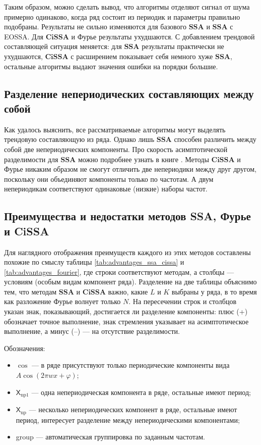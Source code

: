 \documentclass[a4paper, 11pt]{article}
\newcommand{\SSA}{\textbf{SSA}}
\newcommand{\CISSA}{\textbf{CiSSA}}
\newcommand{\TS}{\mathsf{X}}
\begin{document}
Таким образом, можно сделать вывод, что алгоритмы отделяют сигнал от шума примерно одинаково, когда ряд состоит из периодик и параметры правильно подобраны. Результаты не сильно изменяются для базового $\SSA$ и $\SSA$ с EOSSA. Для $\CISSA$ и Фурье результаты ухудшаются. С добавлением трендовой составляющей ситуация меняется: для $\SSA$ результаты практически не ухудшаются, $\CISSA$ с расширением показывает себя немного хуже $\SSA$, остальные алгоритмы выдают значения ошибки на порядки большие.

\subsection{Разделение непериодических составляющих между собой}
\label{subsubsec:nonperiodic}

Как удалось выяснить, все рассматриваемые алгоритмы могут выделять трендовую составляющую из ряда. Однако лишь $\SSA$ способен различить между собой две непериодических компоненты. Про скорость асимптотической разделимости для $\SSA$ можно подробнее узнать в книге \cite{golyandina2001analysis}. Методы $\CISSA$ и Фурье никаким образом не смогут отличить две непериодики между друг другом, поскольку они объединяют компоненты только по частотам. А двум непериодикам соответствуют одинаковые (низкие) наборы частот.


\subsection{Преимущества и недостатки методов SSA, Фурье и CiSSA}

Для наглядного отображения преимуществ каждого из этих методов составлены похожие по смыслу таблицы \ref{tab:advantages_ssa_cissa} и \ref{tab:advantages_fourier}, где строки соответствуют методам, а столбцы --- условиям (особым видам компонент ряда). Разделение на две таблицы объяснимо тем, что методам $\SSA$ и $\CISSA$ важно, какие $L$ и  $K$ выбраны у ряда, в то время как разложение Фурье волнует только $N$. На пересечении строк и столбцов указан знак, показывающий, достигается ли разделение компоненты: плюс (+) обозначает точное выполнение, знак стремления указывает на асимптотическое выполнение, а минус (–) --- на отсутствие разделимости.

Обозначения: 
\begin{itemize}
	\item $\cos$ --- в ряде присутствуют только периодические компоненты вида $A\cos(2\pi w x + \varphi)$;
	\item $\TS_{\mathrm{np}1}$ --- одна непериодическая компонента в ряде, остальные имеют период;
	\item $\TS_{\mathrm{np}}$ --- несколько непериодических компонент в ряде, остальные имеют период, интересует разделение между
	непериодическими компонентами;
	\item group --- автоматическая группировка по заданным частотам.
\end{itemize}
\end{document}
